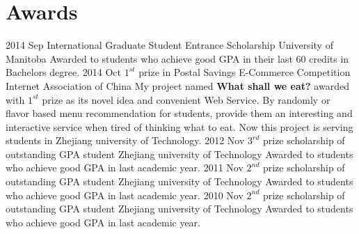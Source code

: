 \documentclass[]{friggeri-cv} %
\begin{document}
\section{Awards}

\begin{entrylist}
	\entry
	{2014 Sep}
	{International Graduate Student Entrance Scholarship}
	{University of Manitoba}
	{Awarded to students who achieve good GPA in their last 60 credits in Bachelors degree.}
	\entry
	{2014 Oct}
	{$1^{st}$ prize in Postal Savings E-Commerce Competition}
	{Internet Association of China}
	{My project named \textbf{What shall we eat?} awarded with $1^{st}$ prize as its novel idea and convenient Web Service. By randomly or flavor based menu recommendation for students, provide them an interesting and interactive service when tired of thinking what to eat. Now this project is serving students in Zhejiang university of Technology.}
	\entry
	{2012 Nov}
	{$3^{rd}$ prize scholarship of outstanding GPA student}
	{Zhejiang university of Technology}
	{Awarded to students who achieve good GPA in last academic year.}
	\entry
	{2011 Nov}
	{$2^{nd}$ prize scholarship of outstanding GPA student}
	{Zhejiang university of Technology}
	{Awarded to students who achieve good GPA in last academic year.}
	\entry
	{2010 Nov}
	{$2^{nd}$ prize scholarship of outstanding GPA student}
	{Zhejiang university of Technology}
	{Awarded to students who achieve good GPA in last academic year.}
\end{entrylist}
\end{document}
